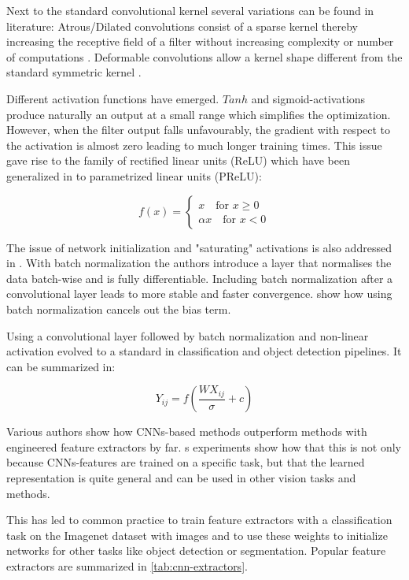 	Next to the standard convolutional kernel several variations can be found in literature: Atrous/Dilated convolutions consist of a sparse kernel thereby increasing the receptive field of a filter without increasing complexity or number of computations . Deformable convolutions allow a kernel shape different from the standard symmetric kernel .
	
	Different activation functions have emerged. $Tanh$ and sigmoid-activations produce naturally an output at a small range which simplifies the optimization. However, when the filter output falls unfavourably, the gradient with respect to the activation is almost zero leading to much longer training times. This issue gave rise to the family of rectified linear units (ReLU) which have been generalized in  to parametrized linear units (PReLU):
	
	$$
	f(x) = \begin{cases}
	x \quad \text{for } x \geq 0 \\
	\alpha x \quad \text{for } x < 0
	\end{cases}
	$$
	
	The issue of network initialization and "saturating" activations is also addressed in \cite{Ioffe2015}. With batch normalization the authors introduce a layer that normalises the data batch-wise and is fully differentiable. Including batch normalization after a convolutional layer leads to more stable and faster convergence.  show how using batch normalization cancels out the bias term.
	
	Using a convolutional layer followed by batch normalization and non-linear activation evolved to a standard in classification and object detection pipelines. It can be summarized in:
	
	$$
	Y_{ij} = f(\frac{WX_{ij}}{\sigma}+c)
	$$
	
	
	
	
	
	Various authors show how \acp{CNN}-based methods outperform methods with engineered feature extractors by far. \cite{Razavian}s experiments show how that this is not only because \acp{CNN}-features are trained on a specific task, but that  the learned representation is quite general and can be used in other vision tasks and methods.
	
	This has led to common practice to train feature extractors with a classification task on the Imagenet dataset with  images and to use these weights to initialize networks for other tasks like object detection or segmentation. Popular feature extractors are summarized in \autoref{tab:cnn-extractors}.
	
